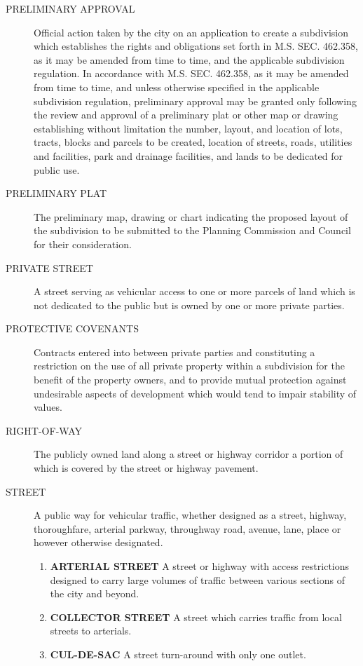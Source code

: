\begin{description}
    \item[PRELIMINARY APPROVAL] Official action taken by the city on an application to create a subdivision which establishes the rights and obligations set forth in M.S. SEC. 462.358, as it may be amended from time to time, and the applicable subdivision regulation.  In accordance with M.S. SEC. 462.358, as it may be amended from time to time, and unless otherwise specified in the applicable subdivision regulation, preliminary approval may be granted only following the review and approval of a preliminary plat or other map or drawing establishing without limitation the number, layout, and location of lots, tracts, blocks and parcels to be created, location of streets, roads, utilities and facilities, park and drainage facilities, and lands to be dedicated for public use.
    \item[PRELIMINARY PLAT] The preliminary map, drawing or chart indicating the proposed layout of the subdivision to be submitted to the Planning Commission and Council for their consideration.
    \item[PRIVATE STREET] A street serving as vehicular access to one or more parcels of land which is not dedicated to the public but is owned by one or more private parties.
    \item[PROTECTIVE COVENANTS] Contracts entered into between private parties and constituting a restriction on the use of all private property within a subdivision for the benefit of the property owners, and to provide mutual protection against undesirable aspects of development which would tend to impair stability of values.
    \item[RIGHT-OF-WAY] The publicly owned land along a street or highway corridor a portion of which is covered by the street or highway pavement.
    \item[STREET] A public way for vehicular traffic, whether designed as a street, highway, thoroughfare, arterial parkway, throughway road, avenue, lane, place or however otherwise designated.
        \begin{enumerate}
            \item \textbf{ARTERIAL STREET} A street or highway with access restrictions designed to carry large volumes of traffic between various sections of the city and beyond.
            \item \textbf{COLLECTOR STREET} A street which carries traffic from local streets to arterials.
            \item \textbf{CUL-DE-SAC} A street turn-around with only one outlet.

\end{enumerate}
\end{description}

